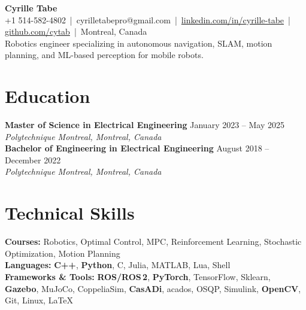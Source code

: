 \documentclass[9.5pt,letterpaper]{article}
\begin{document}
\begin{center}
    {\LARGE\bfseries Cyrille Tabe} \\[1pt]
    {\footnotesize\color{medgray} +1 514-582-4802 \,|\, cyrilletabepro@gmail.com \,|\, \href{https://linkedin.com/in/cyrille-tabe}{linkedin.com/in/cyrille-tabe} \,|\, \href{https://github.com/cytab}{github.com/cytab} \,|\, Montreal, Canada} \\[2pt]
    {\small\color{medgray} Robotics engineer specializing in autonomous navigation, SLAM, motion planning, and ML-based perception for mobile robots.}
\end{center}

\vspace{-4pt}

\section*{Education}
\textbf{Master of Science in Electrical Engineering} \hfill {\small January 2023 -- May 2025} \\
{\small\textit{Polytechnique Montreal, Montreal, Canada}} \\[2pt]
\textbf{Bachelor of Engineering in Electrical Engineering} \hfill {\small August 2018 -- December 2022} \\
{\small\textit{Polytechnique Montreal, Montreal, Canada}}

\section*{Technical Skills}
{\small
\textbf{Courses:} Robotics, Optimal Control, MPC, Reinforcement Learning, Stochastic Optimization, Motion Planning \\
\textbf{Languages:} \textbf{C++}, \textbf{Python}, C, Julia, MATLAB, Lua, Shell \\
\textbf{Frameworks \& Tools:} \textbf{ROS/ROS\,2}, \textbf{PyTorch}, TensorFlow, Sklearn, \textbf{Gazebo}, MuJoCo, CoppeliaSim, \textbf{CasADi}, acados, OSQP, Simulink, \textbf{OpenCV}, Git, Linux, LaTeX
}

\end{document}

